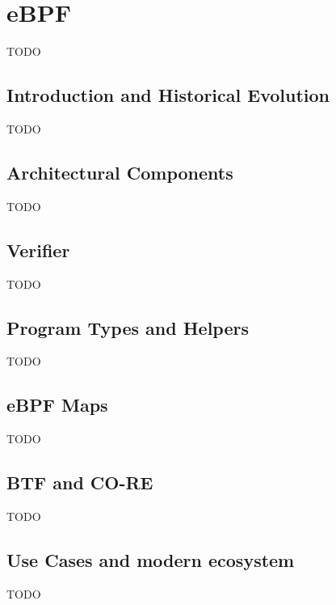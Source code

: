 \chapter{eBPF}

TODO

\section{Introduction and Historical Evolution}

TODO

\section{Architectural Components}

TODO

\section{Verifier}

TODO

\section{Program Types and Helpers}

TODO

\section{eBPF Maps}

TODO

\section{BTF and CO-RE}

TODO

\section{Use Cases and modern ecosystem}

TODO
